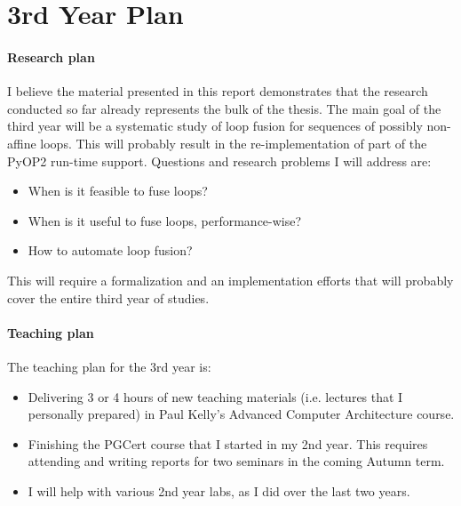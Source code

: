 \section{3rd Year Plan}
\label{sec:thirdyear}

\paragraph{Research plan}
I believe the material presented in this report demonstrates that the research conducted so far already represents the bulk of the thesis. The main goal of the third year will be a systematic study of loop fusion for sequences of possibly non-affine loops. This will probably result in the re-implementation of part of the PyOP2 run-time support. Questions and research problems I will address are:
\begin{itemize}
\item When is it feasible to fuse loops?
\item When is it useful to fuse loops, performance-wise?
\item How to automate loop fusion?
\end{itemize}
This will require a formalization and an implementation efforts that will probably cover the entire third year of studies.

\paragraph{Teaching plan}
The teaching plan for the 3rd year is:
\begin{itemize}
\item Delivering 3 or 4 hours of new teaching materials (i.e. lectures that I personally prepared) in Paul Kelly's Advanced Computer Architecture course.
\item Finishing the PGCert course that I started in my 2nd year. This requires attending and writing reports for two seminars in the coming Autumn term.
\item I will help with various 2nd year labs, as I did over the last two years.
\end{itemize}


